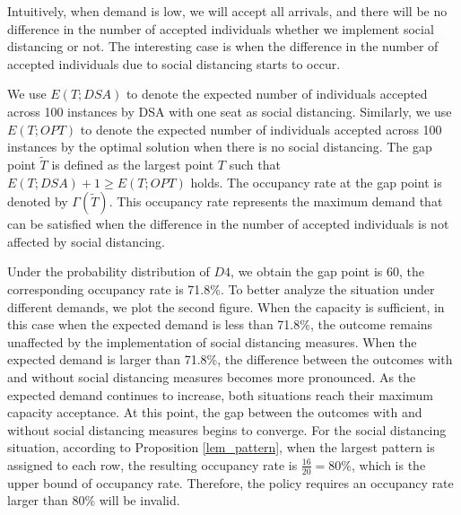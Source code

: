 Intuitively, when demand is low, we will accept all arrivals, and there will be no difference in the number of accepted individuals whether we implement social distancing or not. The interesting case is when the difference in the number of accepted individuals due to social distancing starts to occur.

We use $E(T; DSA)$ to denote the expected number of individuals accepted across 100 instances by DSA with one seat as social distancing. Similarly, we use $E(T; OPT)$ to denote the expected number of individuals accepted across 100 instances by the optimal solution when there is no social distancing. The gap point $\tilde{T}$ is defined as the largest point $T$ such that $E(T; DSA)+1 \geq E(T; OPT)$ holds. The occupancy rate at the gap point is denoted by $\Gamma(\tilde{T})$. This occupancy rate represents the maximum demand that can be satisfied when the difference in the number of accepted individuals is not affected by social distancing.


Under the probability distribution of $D4$, we obtain the gap point is 60, the corresponding occupancy rate is 71.8\%. To better analyze the situation under different demands, we plot the second figure. When the capacity is sufficient, in this case when the expected demand is less than 71.8\%, the outcome remains unaffected by the implementation of social distancing measures. When the expected demand is larger than 71.8\%, the difference between the outcomes with and without social distancing measures becomes more pronounced. As the expected demand continues to increase, both situations reach their maximum capacity acceptance. At this point, the gap between the outcomes with and without social distancing measures begins to converge. For the social distancing situation, according to Proposition \ref{lem_pattern}, when the largest pattern is assigned to each row, the resulting occupancy rate is $\frac{16}{20} = 80\%$, which is the upper bound of occupancy rate. Therefore, the policy requires an occupancy rate larger than 80\% will be invalid.


